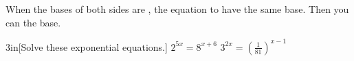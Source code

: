 When the bases of both sides are ,
 the equation to have the same base.
Then you can  the base.

\begin{my2Problems}[\normalsize]{3in}[Solve these exponential equations.]
    {
        $ 2^{5x} = 8^{x+6}$
    }
    {
        $ 3^{2x} = \left(\frac{1}{81}\right)^{x-1} $
    }
\end{my2Problems}
